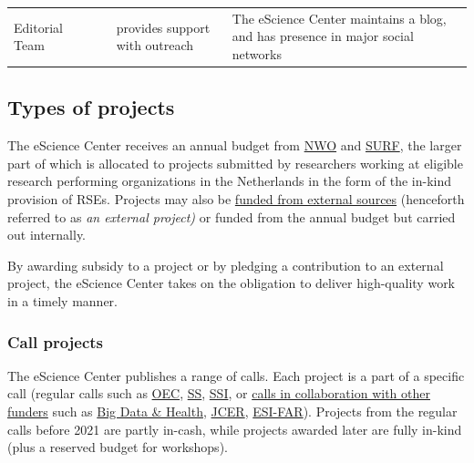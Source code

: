 \begin{tabularx}{\linewidth}{p{}|p{}|p{}|p{}|p{}}
Editorial Team                                     &                       &                                                                                                                   & provides support with outreach                                                                                                                                                                                                         & The eScience Center maintains a blog, and has presence in major social networks                                                     
\end{tabularx}


\subsection{Types of projects}
The eScience Center receives an annual budget from \href{https://www.nwo.nl/}{NWO} and \href{https://www.surf.nl/}{SURF}, the larger part of which is allocated to projects
submitted by researchers working at eligible research performing organizations in the Netherlands in the form of the
in-kind provision of RSEs. Projects may also be \href{https://research-software-directory.org/organisations/netherlands-escience-center?categories=%5B%22External%22%5D&tab=projects}{funded from external sources} (henceforth referred to as \textit{an
external project) }or funded from the annual budget but carried out internally.

By awarding subsidy to a project or by pledging a contribution to an external project, the eScience Center takes on the
obligation to deliver high-quality work in a timely manner.

\subsubsection{Call projects}
The eScience Center publishes a range of calls. Each project is a part of a specific call (regular calls such as
\href{https://doi.org/10.5281/zenodo.6602691}{OEC}, \href{https://doi.org/10.5281/zenodo.10865584}{SS}, \href{10.5281/zenodo.5163292}{SSI}, or \href{https://research-software-directory.org/organisations/netherlands-escience-center?categories=%5B%22Collaborative%20Calls%22%5D&tab=projects}{calls in collaboration with other funders} such as \href{https://zoek.officielebekendmakingen.nl/stcrt-2019-32775.html}{Big Data \& Health}, 
\href{https://www.nwo-i.nl/wp-content/uploads/2017/03/JCER-call-2017_UK.pdf}{JCER}, \href{https://zoek.officielebekendmakingen.nl/stcrt-2019-54263.html}{ESI-FAR}). Projects from the regular calls before 2021 are partly in-cash, while projects awarded later
are fully in-kind (plus a reserved budget for workshops).


